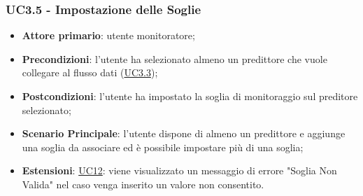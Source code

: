 	\subsubsection{UC3.5 - Impostazione delle Soglie}
		\begin{itemize}
			\item\textbf{Attore primario}: utente monitoratore;
			\item\textbf{Precondizioni}: l'utente ha selezionato almeno un predittore che vuole collegare al flusso dati (\hyperref[par:UC3.3]{UC3.3});
			\item\textbf{Postcondizioni}: l’utente ha impostato la soglia di monitoraggio sul preditore selezionato;
			\item\textbf{Scenario Principale}: l’utente dispone di almeno un predittore e aggiunge una soglia da associare ed è possibile impostare più di una soglia; 
			\item\textbf{Estensioni}: \hyperref[par:UC12]{UC12}: viene visualizzato un messaggio di errore "Soglia Non Valida" nel caso venga inserito un valore non consentito.
		\end{itemize}

	\label{par:UC3.6}
